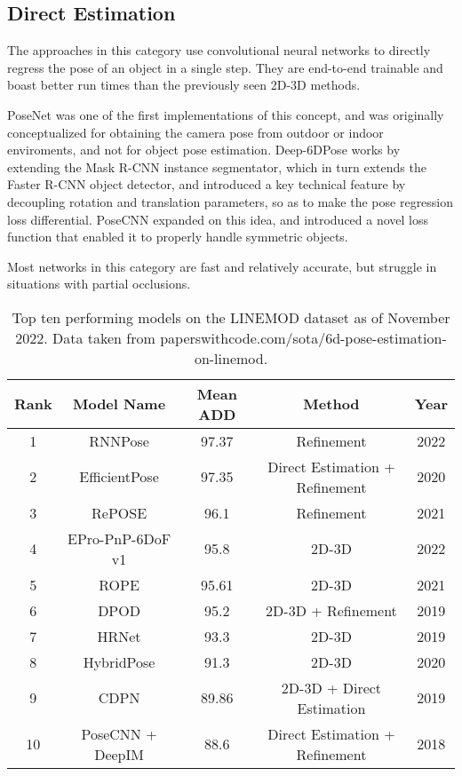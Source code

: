 \subsection{Direct Estimation}
\label{ss:directestimation}

The approaches in this category use convolutional neural networks to directly regress the pose of an object in a single step. They are end-to-end trainable and boast better run times than the previously seen 2D-3D methods.

PoseNet\cite{PoseNet} was one of the first implementations of this concept, and was originally conceptualized for obtaining the camera pose from outdoor or indoor enviroments, and not for object pose estimation. Deep-6DPose\cite{deep6D} works by extending the Mask R-CNN\cite{Mask-R-CNN} instance segmentator, which in turn extends the Faster R-CNN\cite{Faster-R-CNN} object detector, and introduced a key technical feature by decoupling rotation and translation parameters, so as to make the pose regression loss differential. PoseCNN\cite{PoseCNN} expanded on this idea, and introduced a novel loss function that enabled it to properly handle symmetric objects.

Most networks in this category are fast and relatively accurate, but struggle in situations with partial occlusions.

\begin{table}[ht]
    \begin{center}
        \begin{tabular}{||c c c c c||} 
        \hline
        Rank & Model Name & Mean ADD & Method & Year\\ [0.5ex] 
        \hline\hline
        1 & RNNPose & 97.37 & Refinement & 2022 \\ 
        \hline
        2 & EfficientPose & 97.35 & Direct Estimation + Refinement & 2020 \\
        \hline
        3 & RePOSE & 96.1 & Refinement & 2021 \\
        \hline
        4 & EPro-PnP-6DoF v1 & 95.8 & 2D-3D & 2022\\
        \hline
        5 & ROPE & 95.61 & 2D-3D & 2021 \\
        \hline
        6 & DPOD & 95.2 & 2D-3D + Refinement & 2019\\
        \hline
        7 & HRNet  & 93.3 & 2D-3D & 2019 \\
        \hline
        8 & HybridPose & 91.3 & 2D-3D & 2020 \\
        \hline
        9 & CDPN & 89.86 & 2D-3D + Direct Estimation & 2019 \\
        \hline
        10 & PoseCNN + DeepIM & 88.6 & Direct Estimation + Refinement & 2018\\
        \hline
        \end{tabular}
    \caption{Top ten performing models on the LINEMOD dataset\cite{linemod} as of November 2022. Data taken from paperswithcode.com/sota/6d-pose-estimation-on-linemod.}
    \label{tab:top10models}
    \end{center}
\end{table}

